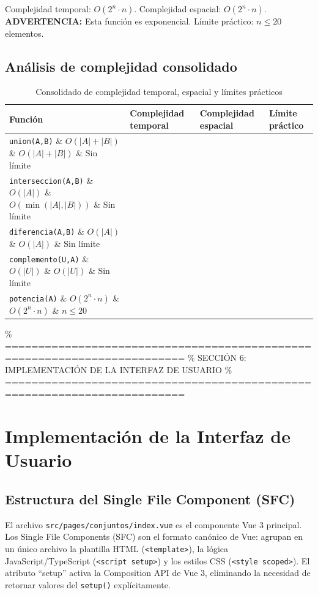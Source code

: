 \documentclass[11pt,a4paper]{article}
\begin{document}
Complejidad temporal: $O(2^n \cdot n)$. Complejidad espacial: $O(2^n \cdot n)$.\\
\textbf{ADVERTENCIA:} Esta función es exponencial. Límite práctico: $n \le 20$ elementos.

\subsection{Análisis de complejidad consolidado}
\begin{table}[htbp]
\centering
\caption{Consolidado de complejidad temporal, espacial y límites prácticos}
\begin{tabularx}{\textwidth}{lXXX}
\toprule
\textbf{Función} & \textbf{Complejidad temporal} & \textbf{Complejidad espacial} & \textbf{Límite práctico} \\
\midrule
\texttt{union(A,B)} \& $O(|A|+|B|)$ \& $O(|A|+|B|)$ \& Sin límite \\
\texttt{interseccion(A,B)} \& $O(|A|)$ \& $O(\min(|A|,|B|))$ \& Sin límite \\
\texttt{diferencia(A,B)} \& $O(|A|)$ \& $O(|A|)$ \& Sin límite \\
\texttt{complemento(U,A)} \& $O(|U|)$ \& $O(|U|)$ \& Sin límite \\
\texttt{potencia(A)} \& $O(2^n \cdot n)$ \& $O(2^n \cdot n)$ \& $n \le 20$ \\
\bottomrule
\end{tabularx}
\end{table}

\newpage

\% =========================================================================
\% SECCIÓN 6: IMPLEMENTACIÓN DE LA INTERFAZ DE USUARIO
\% =========================================================================
\section{Implementación de la Interfaz de Usuario}

\subsection{Estructura del Single File Component (SFC)}
El archivo \texttt{src/pages/conjuntos/index.vue} es el componente Vue 3 principal. Los Single File Components (SFC) son el formato canónico de Vue: agrupan en un único archivo la plantilla HTML (\texttt{<template>}), la lógica JavaScript/TypeScript (\texttt{<script setup>}) y los estilos CSS (\texttt{<style scoped>}). El atributo ``setup'' activa la Composition API de Vue 3, eliminando la necesidad de retornar valores del \texttt{setup()} explícitamente.
\end{document}
